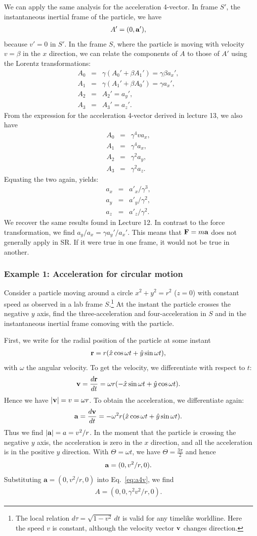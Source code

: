 \documentclass[12pt]{article}
\newcommand{\be}{\begin{eqnarray}}
\newcommand{\ee}{\end{eqnarray}}
\begin{document}
We can apply the same analysis for the acceleration 4-vector. In frame $S'$, the instantaneous inertial frame of the particle, we have 
\be
A' = (0, {\bf a}'),
\ee
because $v' = 0$ in $S'$. 
In the frame $S$, where the particle is moving with velocity $v = \beta$ in the $x$ direction, we can relate the components of $A$ to those of $A'$ using the Lorentz transformations:
\be
A_0 &=& \gamma(A_0' + \beta A_1') = \gamma \beta a_x', \nonumber \\
A_1 &=& \gamma(A_1' + \beta A_0')  = \gamma a_x', \nonumber \\
A_2 &=& A_2' = a_y',\nonumber \\
A_3 &=& A_3' = a_z'.
\ee
From the expression for the acceleration 4-vector derived in lecture 13, we also have 
\be
A_0 &=& \gamma^4 v a_x, \nonumber \\
A_1 &=& \gamma^4 a_x, \nonumber \\
A_2 &=& \gamma^2 a_y, \nonumber \\
A_3 &=& \gamma^2 a_z. \label{eq:a4v}
\ee
Equating the two again, yields:
\be
a_x &=& a'_x/\gamma^3, \nonumber \\
a_y &=& a'_y/\gamma^2, \nonumber \\
a_z &=& a'_z/\gamma^2. \label{eq:AtoA'}
\ee
We recover the same results found in Lecture 12. In contrast to the force transformation, we find $a_y/a_x=\gamma a_y'/a_x'$. This means that ${\bf F}=m{\bf a}$ does not generally apply in SR. If it were true in one frame, it would not be true in another. \\

\subsubsection*{Example 1: Acceleration for circular motion}

Consider a particle moving around a circle $x^2+y^2=r^2$ ($z=0$) with constant speed as observed in a lab frame $S$.\footnote{The local relation $d\tau=\sqrt{1-v^2}\,dt$ is valid for any timelike worldline. Here the speed $v$ is constant, although the velocity vector ${\bf v}$ changes direction.} At the instant the particle crosses the negative $y$ axis, find the three-acceleration and four-acceleration in $S$ and in the instantaneous inertial frame comoving with the particle.

First, we write for the radial position of the particle at some instant
\be
{\bf r} = r(\hat{x}\cos \omega t + \hat{y} \sin \omega t), 
\ee
with $\omega$ the angular velocity. 
To get the velocity, we differentiate with respect to $t$:
\be
{\bf v} = \frac{d{\bf r}}{dt} = \omega r(-\hat{x} \sin \omega t + \hat{y} \cos \omega t).
\ee
Hence we have $|{\bf v}| = v = \omega r$. To obtain the acceleration, we differentiate again:
\be
{\bf a} = \frac{d{\bf v}}{dt} = -\omega^2 r (\hat{x}\cos \omega t + \hat{y} \sin \omega t).
\ee
Thus we find $|{\bf a}| = a = v^2/r$. In the moment that the particle is crossing the negative $y$ axis, the acceleration is zero in the $x$ direction, and all the acceleration is in the positive $y$ direction. With $\Theta = \omega t$, we have $\Theta = \frac{3\pi}{2}$ and hence
\be
{\bf a} = (0, v^2/r,0).
\ee
Substituting $\mathbf a=(0,v^2/r,0)$ into Eq.~\eqref{eq:a4v}, we find
\be
A = (0,0,\gamma^2 v^2/r,0).
\ee
\end{document}
